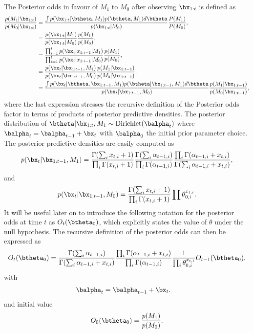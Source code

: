 \documentclass[11pt]{article}
\begin{document}
The Posterior odds in favour of $M_1$ to $M_0$ after observing $\bx_{1:t}$ is defined as
\begin{align}
  \label{eq:general_posterior_odds}
  \frac{p(M_1|\bx_{1:t})}{p(M_0|\bx_{1:t})}  &= \frac{\int p(\bx_{1:t}|\btheta,M_1)p(\btheta,M_1)d\btheta}{p(\bx_{1:t}|M_0)}\frac{P(M_1)}{P(M_0)},\\
                      &=\frac{p(\bx_{1:t}|M_1)}{p(\bx_{1:t}|M_0)}\frac{p(M_1)}{p(M_0)},\\
                      &=\frac{\prod_{i=1}^{t}p(\bx_i|x_{1:i-1}|M_1)}{\prod_{i=1}^{t}p(\bx_i|x_{1:i-1}|M_0)}\frac{p(M_1)}{p(M_0)},\\
                      &=\frac{p(\bx_t|\bx_{1:t-1},M_1)}{p(\bx_t|\bx_{1:t-1},M_0)} \frac{p(M_1|\bx_{1:t-1})}{p(M_0|\bx_{1:t-1})},\\
    &=\frac{\int p(\bx_t|\btheta,\bx_{1:t-1},M_1)p(\btheta|\bx_{1:t-1},M_1)d\btheta}{p(\bx_t|\bx_{1:t-1},M_0)}  \frac{p(M_1|\bx_{1:t-1})}{p(M_0|\bx_{1:t-1})} ,
\end{align}
where the last expression stresses the recursive definition of the Posterior odds factor in terms of products of posterior predictive densities.
The posterior distribution of $\btheta| \bx_{1:t}, M_1 \sim \text{Dirichlet}(\balpha_t)$ where $\balpha_t = \balpha_{t-1}+\bx_t$ with $\balpha_0$ the initial prior parameter choice.
The posterior predictive densities are easily computed as
\begin{equation}
  \label{eq:posterior_predictive_m1}
   p(\bx_t|\bx_{1:t-1},M_1) = \frac{ \Gamma(\sum_i x_{t,i}+ 1)}{\prod_i \Gamma(x_{t,i} + 1)} \frac{\Gamma(\sum_i \alpha_{t-1,i})}{\prod_i \Gamma(\alpha_{t-1,i})} \frac{\prod_i \Gamma(\alpha_{t-1,i} + x_{t,i})}{\Gamma(\sum_i \alpha_{t-1,i} + x_{t,i})},
\end{equation}
and
\begin{equation}
  \label{eq:posterior_predictive_m2}
   p(\bx_t|\bx_{1:t-1},M_0) = \frac{ \Gamma(\sum_i x_{t,i} + 1)}{\prod_i \Gamma(x_{t,i} + 1)} \prod \theta_{0,i}^{x_{t,i}}.
 \end{equation}
 It will be useful later on to introduce the following notation for the posterior odds at time $t$ as $O_t(\btheta_0)$, which explicitly states the value of $\theta$ under the null hypothesis.
The recursive definition of the posterior odds can then be expressed as
\begin{align}
  O_{t}(\btheta_0) &= \frac{\Gamma(\sum_i \alpha_{t-1,i})}{\Gamma(\sum_i \alpha_{t-1,i} +  x_{t,i})} \frac{\prod_i \Gamma(\alpha_{t-1,i} + x_{t,i})}{\prod_i \Gamma(\alpha_{t-1,i})} \frac{1}{\prod_i \theta_{0,i}^{x_{t,i}}}  O_{t-1}(\btheta_0),\\
\end{align}
with
\begin{align}
  \label{eq:alpha_update}
  \balpha_{t}&= \balpha_{t-1}+\bx_t.
\end{align}
and initial value
\begin{align}
  \label{eq:bayes_factor_seed}
O_0(\btheta_0) = \frac{p(M_1)}{p(M_0)}.
\end{align}
\end{document}

